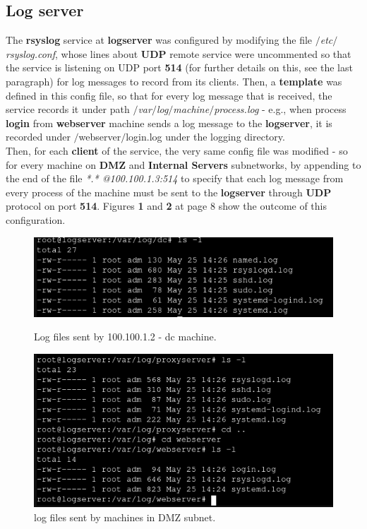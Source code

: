 \subsection{Log server}
The \textbf{rsyslog} service at \textbf{logserver} was configured by modifying the file \textit{$/$etc$/$rsyslog.conf}, whose lines about \textbf{UDP} remote service were uncommented so that the service is listening on UDP port \textbf{514} (for further details on this, see the last paragraph) for log messages to record from its clients. Then, a \textbf{template} was defined in this config file, so that for every log message that is received, the service records it under path \textit{$/$var$/$log$/$machine$/$process.log} - e.g., when process \textbf{login} from \textbf{webserver} machine sends a log message to the \textbf{logserver}, it is recorded under $/$webserver$/$login.log under the logging directory.\\
Then, for each \textbf{client} of the service, the very same config file was modified - so for every machine on \textbf{DMZ} and \textbf{Internal Servers} subnetworks, by appending to the end of the file \textit{*.* @100.100.1.3:514} to specify that each log message from every process of the machine must be sent to the \textbf{logserver} through \textbf{UDP} protocol on port \textbf{514}. Figures \textbf{1} and \textbf{2} at page 8 show the outcome of this configuration.\\

\begin{figure}[H]
\centering
\begin{minipage}{.5\textwidth}
  \centering
  \includegraphics[width=1\textwidth]{logserver_dc.png}
  \caption[a]{Log files sent by 100.100.1.2 - dc machine.}\label{fig:1}
\end{minipage}%
\begin{minipage}{.5\textwidth}
  \centering
  \includegraphics[width=1\textwidth]{logserver_dmz.png}
  \caption[a]{log files sent by machines in DMZ subnet.}\label{fig:2}
\end{minipage}
\end{figure}
